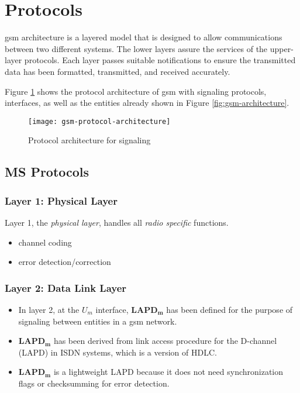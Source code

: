 \section{Protocols}
\gls{gsm} architecture is a layered model that is designed to allow communications between two different systems. The lower layers assure the services of the upper-layer protocols. Each layer passes suitable notifications to ensure the transmitted data has been formatted, transmitted, and received accurately.

Figure \ref{fig:gsm-protocol-architecture} shows the protocol architecture of \gls{gsm} with signaling protocols, interfaces, as well as the entities already shown in Figure \ref{fig:gsm-architecture}. 

\begin{figure}[hb!]
	\centering
	\texttt{[image: gsm-protocol-architecture]}
	\caption[GSM Protocol architecture.]{Protocol architecture for signaling}
	\label{fig:gsm-protocol-architecture}
\end{figure}



\subsection{MS Protocols}

\subsubsection{Layer 1: Physical Layer}
Layer 1, the \textit{physical layer}, handles all \textit{radio specific} functions.
\begin{itemize}
	\item channel coding
	\item error detection/correction
\end{itemize}



\subsubsection{Layer 2: Data Link Layer}
\begin{itemize}
	\item In layer 2, at the \(U_m\) interface, \(\mathbf{LAPD_m}\) has been defined for the purpose of signaling between entities in a \gls{gsm} network.
	\item \(\mathbf{LAPD_m}\) has been derived from link access procedure for the D-channel (LAPD) in ISDN systems, which is a version of HDLC.
	\item \(\mathbf{LAPD_m}\) is a lightweight LAPD because it does not need synchronization flags or checksumming for error detection.
\end{itemize}

